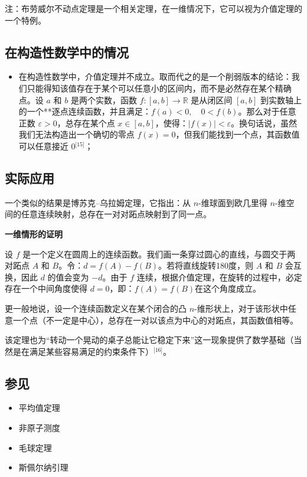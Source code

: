 注：布劳威尔不动点定理是一个相关定理，在一维情况下，它可以视为介值定理的一个特例。
\subsection{在构造性数学中的情况}
\begin{itemize}
\item 在构造性数学中，介值定理并不成立。取而代之的是一个削弱版本的结论：我们只能得知该值存在于某个可以任意小的区间内，而不是必然存在某个精确点。设 $a$ 和 $b$ 是两个实数，函数 $f: [a, b] \to \mathbb{R}$ 是从闭区间 $[a, b]$ 到实数轴上的一个**逐点连续函数，并且满足：$f(a) < 0,\quad 0 < f(b)$。那么对于任意正数 $\varepsilon > 0$，总存在某个点 $x \in [a, b]$，使得：$|f(x)| < \varepsilon$。换句话说，虽然我们无法构造出一个确切的零点 $f(x) = 0$，但我们能找到一个点，其函数值可以任意接近 0\(^\text{[15]}\)；
\end{itemize}
\subsection{实际应用}
一个类似的结果是博苏克–乌拉姆定理，它指出：从 $n$-维球面到欧几里得 $n$-维空间的任意连续映射，总存在一对对跖点映射到了同一点。

\textbf{一维情形的证明}

设 $f$ 是一个定义在圆周上的连续函数。我们画一条穿过圆心的直线，与圆交于两对跖点 $A$ 和 $B$。令：$d = f(A) - f(B)$。若将直线旋转180度，则 $A$ 和 $B$ 会互换，因此 $d$ 的值会变为 $-d$。由于 $f$ 连续，根据介值定理，在旋转的过程中，必定存在一个中间角度使得 $d = 0$，即：$f(A) = f(B)$在这个角度成立。

更一般地说，设一个连续函数定义在某个闭合的凸 $n$-维形状上，对于该形状中任意一个点（不一定是中心），总存在一对以该点为中心的对跖点，其函数值相等。

该定理也为“转动一个晃动的桌子总能让它稳定下来”这一现象提供了数学基础（当然是在满足某些容易满足的约束条件下）\(^\text{[16]}\)。
\subsection{参见}
\begin{itemize}
\item 平均值定理
\item 非原子测度
\item 毛球定理
\item 斯佩尔纳引理
\end{itemize}
